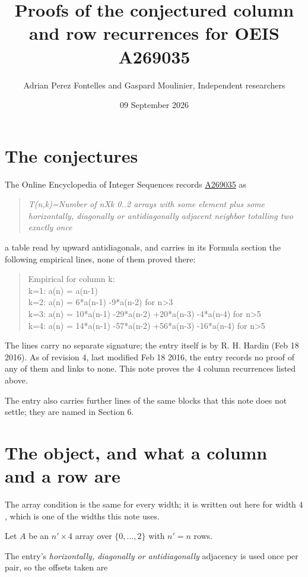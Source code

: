 \documentclass[11pt]{article}
\title{Proofs of the conjectured column and row recurrences for OEIS A269035}
\author{Adrian Perez Fontelles and Gaspard Moulinier, Independent researchers}
\date{09 September 2026}
\theoremstyle{definition}
\begin{document}
\maketitle
\section{The conjectures}

The Online Encyclopedia of Integer Sequences records \href{https://oeis.org/A269035}{A269035} as

\begin{quote}\itshape T(n,k)=Number of nXk 0..2 arrays with some element plus some horizontally, diagonally or antidiagonally adjacent neighbor totalling two exactly once\end{quote}

a table read by upward antidiagonals, and carries in its Formula section the following empirical lines, none of them proved there:

\begin{quote}\ttfamily Empirical for column k:\\
k=1: a(n) = a(n-1)\\k=2: a(n) = 6*a(n-1) -9*a(n-2) for n>3\\k=3: a(n) = 10*a(n-1) -29*a(n-2) +20*a(n-3) -4*a(n-4) for n>5\\k=4: a(n) = 14*a(n-1) -57*a(n-2) +56*a(n-3) -16*a(n-4) for n>5\end{quote}

The lines carry no separate signature; the entry itself is by R. H. Hardin (Feb 18 2016). As of revision 4, last modified Feb 18 2016, the entry records no proof of any of them and links to none. This note proves the 4 column recurrences listed above.

The entry also carries further lines of the same blocks that this note does not settle; they are named in Section 6.

\section{The object, and what a column and a row are}

The array condition is the same for every width; it is written out here for width $4$, which is one of the widths this note uses.

Let $A$ be an $n' \times 4$ array over $\{0,\dots,2\}$ with $n' = n$ rows.

The entry's {\itshape horizontally, diagonally or antidiagonally} adjacency is used once per pair, so the offsets taken are
\end{document}
